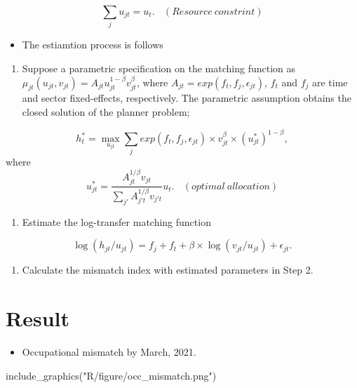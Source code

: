 \documentclass[
]{book}
\newenvironment{Shaded}{\begin{snugshade}}{\end{snugshade}}
\newcommand{\FunctionTok}[1]{\textcolor[rgb]{0.00,0.00,0.00}{#1}}
\newcommand{\NormalTok}[1]{#1}
\newcommand{\StringTok}[1]{\textcolor[rgb]{0.31,0.60,0.02}{#1}}
\providecommand{\tightlist}{%
  \setlength{\itemsep}{0pt}\setlength{\parskip}{0pt}}
\begin{document}
\[\sum_{j}u_{jt}=u_t.\ \ \ \ (Resource\ constrint)\]

\begin{itemize}
\tightlist
\item
  The estiamtion process is follows
\end{itemize}

\begin{enumerate}
\def\labelenumi{\arabic{enumi}.}
\tightlist
\item
  Suppose a parametric specification on the matching function as \(\mu_{jt}(u_{jt},v_{jt})=A_{jt}u_{jt}^{1-\beta}v_{jt}^{\beta}\), where \(A_{jt}=exp(f_t,f_j,\epsilon_{jt})\), \(f_t\) and \(f_j\) are time and sector fixed-effects, respectively.
  The parametric assumption obtains the closed solution of the planner problem;
\end{enumerate}

\[h_t^*=\max_{u_{jt}} \sum_j exp(f_t,f_j,\epsilon_{jt})\times v_{jt}^{\beta}\times (u_{jt}^*)^{1-\beta},\]
where
\[u_{jt}^*=\frac{A_{jt}^{1/\beta}v_{jt}}{\sum_{j'}A_{j't}^{1/\beta}v_{j't}}u_{t}.\ \ \ \ (optimal\ allocation)\]

\begin{enumerate}
\def\labelenumi{\arabic{enumi}.}
\setcounter{enumi}{1}
\tightlist
\item
  Estimate the log-transfer matching function
\end{enumerate}

\[\log(h_{jt}/u_{jt})=f_{j}+f_{t}+\beta\times\log(v_{jt}/u_{jt})+\epsilon_{jt}.\]

\begin{enumerate}
\def\labelenumi{\arabic{enumi}.}
\setcounter{enumi}{2}
\tightlist
\item
  Calculate the mismatch index with estimated parameters in Step 2.
\end{enumerate}

\hypertarget{result}{%
\chapter{Result}\label{result}}

\begin{itemize}
\tightlist
\item
  Occupational mismatch by March, 2021.
\end{itemize}

\begin{Shaded}
\begin{Highlighting}[]
\FunctionTok{include\_graphics}\NormalTok{(}\StringTok{"R/figure/occ\_mismatch.png"}\NormalTok{)}
\end{Highlighting}
\end{Shaded}
\end{document}
